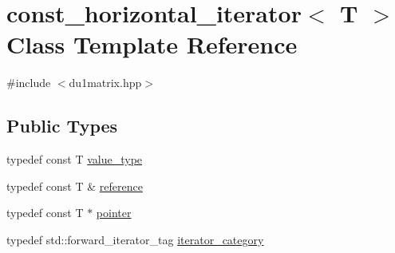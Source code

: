 \hypertarget{classconst__horizontal__iterator}{\section{const\-\_\-horizontal\-\_\-iterator$<$ T $>$ Class Template Reference}
\label{classconst__horizontal__iterator}
}


{\ttfamily \#include $<$du1matrix.\-hpp$>$}

\subsection*{Public Types}
\begin{DoxyCompactItemize}
\item 
typedef const T \hyperlink{classconst__horizontal__iterator_a426fd02977338edd9904f1bdfb7f9d6a}{value\-\_\-type}
\item 
typedef const T \& \hyperlink{classconst__horizontal__iterator_aa685786b86159c42546250d5026fa205}{reference}
\item 
typedef const T $\ast$ \hyperlink{classconst__horizontal__iterator_a44794e7f9d7ca88a648604b53ee343e4}{pointer}
\item 
typedef std\-::forward\-\_\-iterator\-\_\-tag \hyperlink{classconst__horizontal__iterator_a4ad9daf1ad6ddc77fa10f3a5ad155919}{iterator\-\_\-category}
\end{DoxyCompactItemize}
